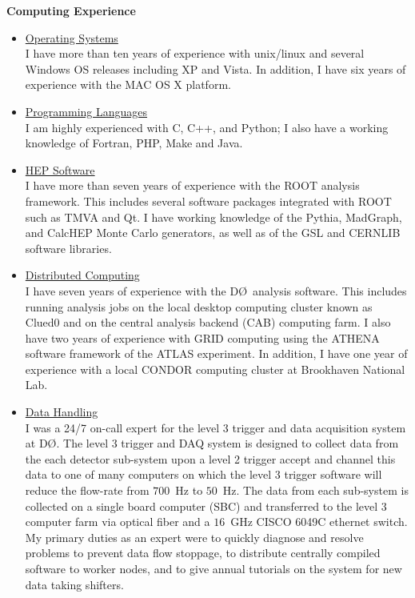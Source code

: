 \documentclass[12pt]{article}
\newcommand{\dzero}{D\O}
\begin{document}
\begin{singlespace}
\clearpage
\noindent
{\Large \textbf{Computing Experience}}
\begin{itemize}
\item{\underline{Operating Systems}\\
I have more than ten years of experience with {\sc unix/linux} and several Windows OS releases including XP and Vista. In addition, I have six years of experience with the MAC OS X platform.}
\item{\underline{Programming Languages}\\ I am highly experienced with {\sc C}, {\sc C++},  and {\sc Python};  I also have a working knowledge of {\sc Fortran}, {\sc PHP}, {\sc Make} and {\sc Java}.}
\item{\underline{HEP Software}\\ I have more than seven years of experience with the {\sc ROOT} analysis framework. This includes several software packages integrated with {\sc ROOT} such as {\sc TMVA} and {\sc Qt}. I have working knowledge of the {\sc Pythia}, {\sc MadGraph}, and {\sc CalcHEP} Monte Carlo generators, as well as of the {\sc GSL} and {\sc CERNLIB} software libraries.}
\item{\underline{Distributed Computing}\\ I have seven years of experience with the \dzero~analysis software. This includes running analysis jobs on the local desktop computing cluster known as Clued0 and on the central analysis backend (CAB) computing farm. I also have two years of experience with GRID computing using the {\sc ATHENA} software framework of the ATLAS experiment. In addition, I have one year of experience with a local CONDOR computing cluster at Brookhaven National Lab.}
\item{\underline{Data Handling} \\
I was a 24/7 on-call expert for the level 3 trigger and data acquisition system at \dzero. The level 3 trigger and DAQ system is designed to collect data from the each detector sub-system upon a level 2 trigger accept and channel this data to one of many computers on which the level 3 trigger software will reduce the flow-rate from $700$~Hz to $50$~Hz. The data from each sub-system is collected on a single board computer (SBC) and transferred to the level 3 computer farm via optical fiber and a $16$~GHz CISCO 6049C ethernet switch. My primary duties as an expert were to quickly diagnose and resolve problems to prevent data flow stoppage, to distribute centrally compiled software to worker nodes, and to give annual tutorials on the system for new data taking shifters.}

\end{itemize}
\end{singlespace}
\end{document}
